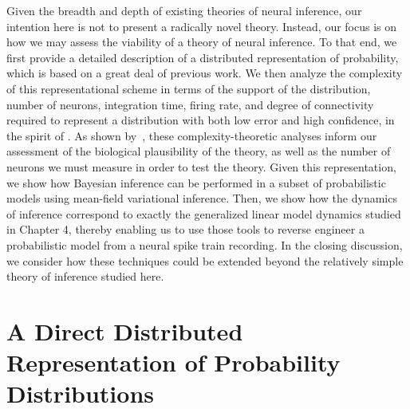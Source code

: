 Given the breadth and depth of existing theories of neural inference,
our intention here is not to present a radically novel
theory. Instead, our focus is on how we may assess the viability of a
theory of neural inference. To that end, we first provide a detailed
description of a distributed representation of probability, which is
based on a great deal of previous work.  We then analyze the
complexity of this representational scheme in terms of the support of
the distribution, number of neurons, integration time, firing rate,
and degree of connectivity required to represent a distribution with
both low error and high confidence, in the spirit of
\citet{valiant1994circuits, valiant2005memorization}.  As shown by~\citet{gao2015simplicity},
these complexity-theoretic analyses inform our assessment of the
biological plausibility of the theory, as well as the number of
neurons we must measure in order to test the theory. Given this
representation, we show how Bayesian inference can be performed in a
subset of probabilistic models using mean-field variational
inference. Then, we show how the dynamics of inference correspond to
exactly the generalized linear model dynamics studied in Chapter 4,
thereby enabling us to use those tools to reverse engineer a
probabilistic model from a neural spike train recording.  In the
closing discussion, we consider how these techniques could be extended
beyond the relatively simple theory of inference studied here.

\section{A Direct Distributed Representation of Probability Distributions}

